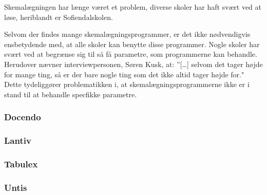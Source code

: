 Skemalægningen har længe været et problem, diverse skoler har haft svært ved at løse, heriblandt er Sofiendalskolen.

Selvom der findes mange skemalægningsprogrammer, er det ikke nødvendigvis ensbetydende med, at alle skoler kan benytte disse programmer. Nogle skoler har svært ved at begrænse sig til så få parametre, som programmerne kan behandle. Herudover nævner interviewpersonen, Søren Kusk, at: ”[…] selvom det tager højde for mange ting, så er der bare nogle ting som det ikke altid tager højde for." Dette tydeliggører problematikken i, at skemalægningsprogrammerne ikke er i stand til at behandle specfikke parametre.

  \subsubsection{Docendo}
    

  \subsubsection{Lantiv}
    

  \subsubsection{Tabulex}
    

  \subsubsection{Untis}
    